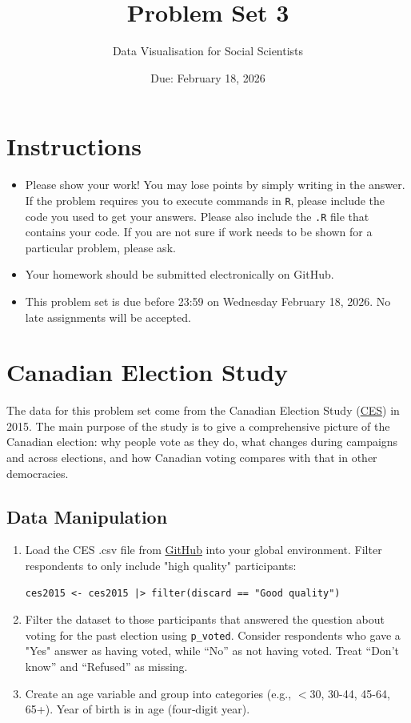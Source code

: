 \documentclass[12pt,letterpaper]{article}
\title{Problem Set 3}
\date{Due: February 18, 2026}
\author{Data Visualisation for Social Scientists}
\begin{document}
	\maketitle
	
	\section*{Instructions}
	\begin{itemize}
	\item Please show your work! You may lose points by simply writing in the answer. If the problem requires you to execute commands in \texttt{R}, please include the code you used to get your answers. Please also include the \texttt{.R} file that contains your code. If you are not sure if work needs to be shown for a particular problem, please ask.
\item Your homework should be submitted electronically on GitHub.
\item This problem set is due before 23:59 on Wednesday February 18, 2026. No late assignments will be accepted.
	\end{itemize}
	
	\vspace{.25cm}
	\section*{Canadian Election Study}
	
The data for this problem set come from the	Canadian Election Study (\href{https://ces-eec.sites.olt.ubc.ca/files/2017/04/CES2015_Combined_Data_Codebook.pdf}{CES})  in 2015. The main purpose of the study is to give a comprehensive picture of the Canadian election: why people vote as they do, what changes during campaigns and across elections, and how Canadian voting compares with that in other democracies.

\subsection*{Data Manipulation}

\begin{enumerate}
\item Load the CES .csv file from \href{https://raw.githubusercontent.com/ASDS-TCD/DataViz_2026/refs/heads/main/datasets/CES2015.csv}{GitHub} into your global environment. Filter respondents to only include "high quality" participants: 
\begin{verbatim}
ces2015 <- ces2015 |> filter(discard == "Good quality")
\end{verbatim}
\item Filter the dataset to those participants that answered the question about voting for the past election using \texttt{p\_voted}. Consider respondents who gave a "Yes" answer as having voted, while “No” as not having voted. Treat “Don’t know” and “Refused” as missing.
\item Create an age variable and group into categories (e.g., $<$30, 30-44, 45-64, 65+). Year of birth is in age (four‑digit year).
\end{enumerate}
\end{document}
